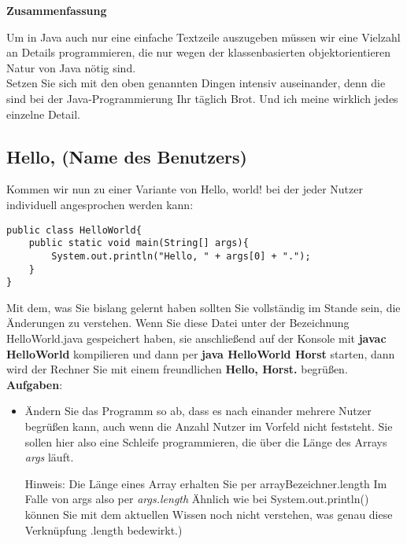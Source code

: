 \textbf{Zusammenfassung}

Um in Java auch nur eine einfache Textzeile auszugeben müssen wir eine Vielzahl an Details programmieren, die nur wegen der klassenbasierten objektorientieren Natur von Java nötig sind.\\

Setzen Sie sich mit den oben genannten Dingen intensiv auseinander, denn die sind bei der Java-Programmierung Ihr täglich Brot. Und ich meine wirklich jedes einzelne Detail.

\subsection{Hello, (Name des Benutzers)}

Kommen wir nun zu einer Variante von Hello, world! bei der jeder Nutzer individuell angesprochen werden kann:

\begin{verbatim}
public class HelloWorld{
    public static void main(String[] args){
        System.out.println("Hello, " + args[0] + ".");
    }
}
\end{verbatim}

Mit dem, was Sie bislang gelernt haben sollten Sie vollständig im Stande sein, die Änderungen zu verstehen. Wenn Sie diese Datei unter der Bezeichnung HelloWorld.java gespeichert haben, sie anschließend auf der Konsole mit \textbf{javac HelloWorld} kompilieren und dann per \textbf{java HelloWorld Horst} starten, dann wird der Rechner Sie mit einem freundlichen \textbf{Hello, Horst.} begrüßen.\\

\textbf{Aufgaben}:

\begin{itemize}
	\item Ändern Sie das Programm so ab, dass es nach einander mehrere Nutzer begrüßen kann, auch wenn die Anzahl Nutzer im Vorfeld nicht feststeht. Sie sollen hier also eine Schleife programmieren, die über die Länge des Arrays \emph{args} läuft.
	
	Hinweis: Die Länge eines Array erhalten Sie per arrayBezeichner.length Im Falle von args also per \emph{args.length} Ähnlich wie bei System.out.println() können Sie mit dem aktuellen Wissen noch nicht verstehen, was genau diese Verknüpfung .length bedewirkt.)
\end{itemize}